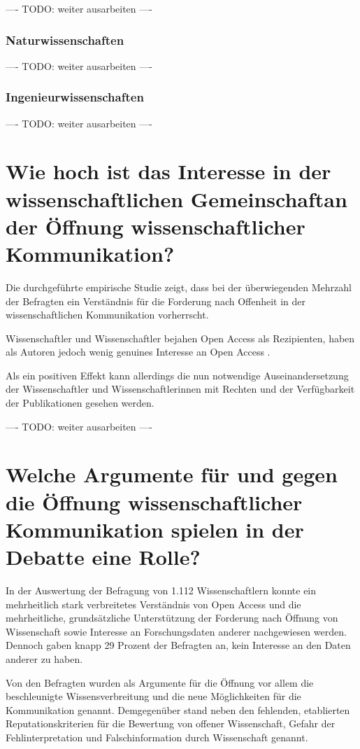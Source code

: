 ---- TODO: weiter ausarbeiten ----

\subsubsection{Naturwissenschaften}

---- TODO: weiter ausarbeiten ----

\subsubsection{Ingenieurwissenschaften}

---- TODO: weiter ausarbeiten ----

\section{Wie hoch ist das Interesse in der wissenschaftlichen Gemeinschaftan der Öffnung wissenschaftlicher Kommunikation?}

Die durchgeführte empirische Studie zeigt, dass bei der überwiegenden Mehrzahl der Befragten ein Verständnis für die Forderung nach Offenheit in der wissenschaftlichen Kommunikation vorherrscht.

Wissenschaftler und Wissenschaftler bejahen Open Access als Rezipienten, haben als Autoren jedoch wenig genuines Interesse an Open Access \cite{wein_2010_erwerbung}.

Als ein positiven Effekt kann allerdings die nun notwendige Auseinandersetzung der Wissenschaftler und Wissenschaftlerinnen mit Rechten und der Verfügbarkeit der Publikationen gesehen werden.

---- TODO: weiter ausarbeiten ----


\section{Welche Argumente für und gegen die Öffnung wissenschaftlicher Kommunikation spielen in der Debatte eine Rolle?}

In der Auswertung der Befragung von 1.112 Wissenschaftlern konnte ein mehrheitlich stark verbreitetes Verständnis von Open Access und die mehrheitliche, grundsätzliche Unterstützung der Forderung nach Öffnung von Wissenschaft sowie Interesse an Forschungsdaten anderer nachgewiesen werden. Dennoch gaben knapp 29 Prozent der Befragten an, kein Interesse an den Daten anderer zu haben.

Von den Befragten wurden als Argumente für die Öffnung vor allem die beschleunigte Wissensverbreitung und die neue Möglichkeiten für die Kommunikation genannt. Demgegenüber stand neben den fehlenden, etablierten Reputationskriterien für die Bewertung von offener Wissenschaft, Gefahr der Fehlinterpretation und Falschinformation durch Wissenschaft genannt.

